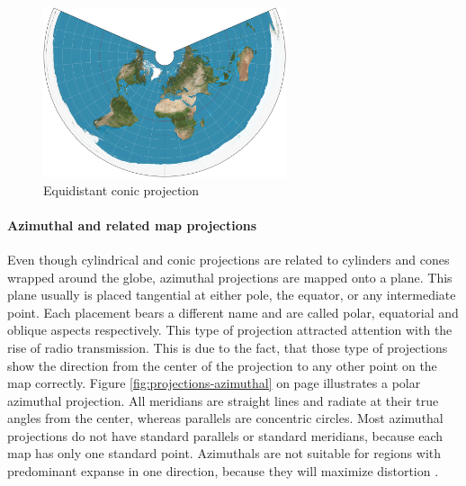\begin{enumerate}
\begin{figure}[!htb]
\centering
\includegraphics[height=5cm,keepaspectratio]{images/methods/projections/equidistant.jpg}
\caption[
    Equidistant conic projection, Urldate: 07.2016 \newline
    \small\texttt{\url{https://upload.wikimedia.org/wikipedia/commons/d/d8/Equidistant_conic_projection_SW.JPG}}.
]{Equidistant conic projection}
\label{fig:projections-equidistant}
\end{figure}

\end{enumerate}
\paragraph{Azimuthal and related map projections}
Even though cylindrical and conic projections are related to cylinders and cones wrapped around the globe, azimuthal projections are mapped onto a plane. This plane usually is placed tangential at either pole, the equator, or any intermediate point. Each placement bears a different name and are called polar, equatorial and oblique aspects respectively. This type of projection attracted attention with the rise of radio transmission. This is due to the fact, that those type of projections show the direction from the center of the projection to any other point on the map correctly. Figure \ref{fig:projections-azimuthal} on page \pageref{fig:projections-azimuthal} illustrates a polar azimuthal projection. All meridians are straight lines and radiate at their true angles from the center, whereas parallels are concentric circles. Most azimuthal projections do not have standard parallels or standard meridians, because each map has only one standard point. Azimuthals are not suitable for regions with predominant expanse in one direction, because they will maximize distortion .


